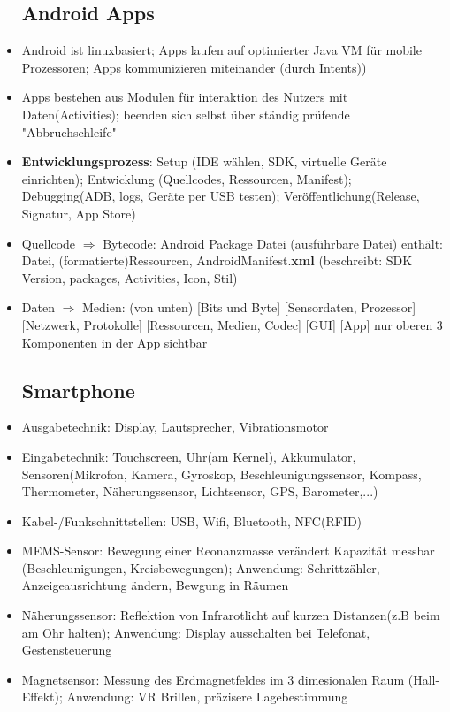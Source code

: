 \documentclass[12pt,landscape]{article}
\begin{document}
\begin{multicols}{3}
\begin{itemize}
\subsection{Android Apps}
\item Android ist linuxbasiert; Apps laufen auf optimierter Java VM für mobile Prozessoren; Apps kommunizieren miteinander (durch Intents)) 
\item Apps bestehen aus Modulen für interaktion des Nutzers mit Daten(Activities); beenden sich selbst über ständig prüfende "Abbruchschleife"
\item \textbf{Entwicklungsprozess}: Setup (IDE wählen, SDK, virtuelle Geräte einrichten); Entwicklung (Quellcodes, Ressourcen, Manifest); Debugging(ADB, logs, Geräte per USB testen); Veröffentlichung(Release, Signatur, App Store)
\item Quellcode $\Rightarrow$ Bytecode: Android Package Datei (ausführbare Datei) enthält: Datei, (formatierte)Ressourcen, AndroidManifest.\textbf{xml} (beschreibt: SDK Version, packages, Activities, Icon, Stil)
\item Daten $\Rightarrow$ Medien: (von unten) [Bits und Byte] [Sensordaten, Prozessor] [Netzwerk, Protokolle] [Ressourcen, Medien, Codec] [GUI] [App] nur oberen 3 Komponenten in der App sichtbar
\subsection{Smartphone}
\item Ausgabetechnik: Display, Lautsprecher, Vibrationsmotor
\item Eingabetechnik: Touchscreen, Uhr(am Kernel), Akkumulator, Sensoren(Mikrofon, Kamera, Gyroskop, Beschleunigungssensor, Kompass, Thermometer, Näherungssensor, Lichtsensor, GPS, Barometer,...)
\item Kabel-/Funkschnittstellen: USB, Wifi, Bluetooth, NFC(RFID)
\item MEMS-Sensor: Bewegung einer Reonanzmasse verändert Kapazität messbar (Beschleunigungen, Kreisbewegungen); Anwendung: Schrittzähler, Anzeigeausrichtung ändern, Bewgung in Räumen
\item Näherungssensor: Reflektion von Infrarotlicht auf kurzen Distanzen(z.B beim am Ohr halten); Anwendung: Display ausschalten bei Telefonat, Gestensteuerung
\item Magnetsensor: Messung des Erdmagnetfeldes im 3 dimesionalen Raum (Hall-Effekt); Anwendung: VR Brillen, präzisere Lagebestimmung

\end{itemize}
\end{multicols}
\end{document}
